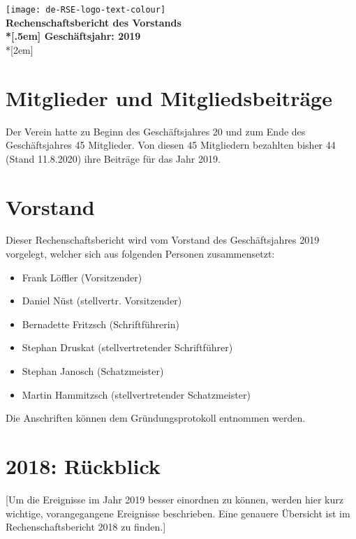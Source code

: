 \newcommand{\jahr}{2019}



\thispagestyle{empty}

\begin{centering}
\texttt{[image: de-RSE-logo-text-colour]}\\
\vspace{1em}
\textbf{
 \Large Rechenschaftsbericht des Vorstands\\*[.5em]
 \normalsize Geschäftsjahr: \jahr}\\*[2em]
\end{centering}

\section{Mitglieder und Mitgliedsbeiträge}

Der Verein hatte zu Beginn des Geschäftsjahres 20 und zum Ende des Geschäftsjahres 45 Mitglieder. Von diesen 45 Mitgliedern bezahlten bisher 44 (Stand 11.8.2020) ihre Beiträge für das Jahr 2019.

\section{Vorstand}

Dieser Rechenschaftsbericht wird vom Vorstand des Geschäftsjahres 2019 vorgelegt, welcher sich aus folgenden Personen zusammensetzt:

\begin{itemize}
  \setlength{\itemsep}{0pt plus 1pt}
  \item Frank Löffler (Vorsitzender)
  \item Daniel Nüst (stellvertr. Vorsitzender)
  \item Bernadette Fritzsch (Schriftführerin)
  \item Stephan Druskat (stellvertretender Schriftführer)
  \item Stephan Janosch (Schatzmeister)
  \item Martin Hammitzsch (stellvertretender Schatzmeister)
\end{itemize}

Die Anschriften können dem Gründungsprotokoll entnommen werden.

\section{2018: Rückblick}

[Um die Ereignisse im Jahr 2019 besser einordnen zu können, werden hier kurz wichtige,
vorangegangene Ereignisse beschrieben. Eine genauere Übersicht ist im Rechenschaftsbericht
2018 zu finden.]

